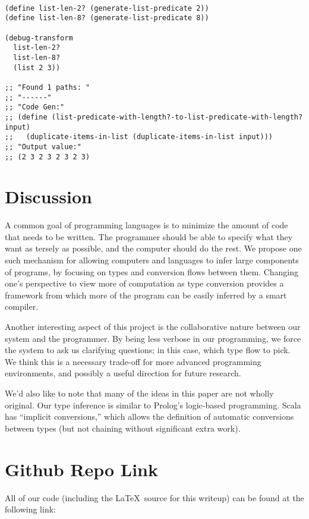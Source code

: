 \documentclass[letterpaper]{article}
\begin{document}
\begin{verbatim}

(define list-len-2? (generate-list-predicate 2))
(define list-len-8? (generate-list-predicate 8))

(debug-transform
  list-len-2?
  list-len-8?
  (list 2 3))

;; "Found 1 paths: "
;; "------"
;; "Code Gen:"
;; (define (list-predicate-with-length?-to-list-predicate-with-length? input)
;;   (duplicate-items-in-list (duplicate-items-in-list input)))
;; "Output value:"
;; (2 3 2 3 2 3 2 3)

\end{verbatim}

\section{Discussion}

A common goal of programming languages is to minimize the amount of code that needs to be written.  The programmer should be able to specify what they want as tersely as possible, and the computer should do the rest.  We propose one such mechanism for allowing computers and languages to infer large components of programs, by focusing on types and conversion flows between them.  Changing one's perspective to view more of computation as type conversion provides a framework from which more of the program can be easily inferred by a smart compiler.

Another interesting aspect of this project is the collaborative nature between our system and the programmer.  By being less verbose in our programming, we force the system to ask us clarifying questions; in this case, which type flow to pick.  We think this is a necessary trade-off for more advanced programming environments, and possibly a useful direction for future research.

We'd also like to note that many of the ideas in this paper are not wholly original.  Our type inference is similar to Prolog's logic-based programming.  Scala has ``implicit conversions,'' which allows the definition of automatic conversions between types (but not chaining without significant extra work).

\appendix
\section{Github Repo Link}

All of our code (including the \LaTeX\, source for this writeup) can be found at the following link:
\end{document}
